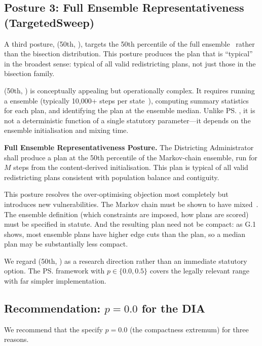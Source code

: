 \subsection{Posture 3: Full Ensemble Representativeness (TargetedSweep)}

A third posture, \ts{}(50th, \recom{}), targets the 50th percentile of the
full \recom{} ensemble~\citep{deford2021} rather than the bisection
distribution.
This posture produces the plan that is ``typical'' in the broadest sense:
typical of all valid redistricting plans, not just those in the bisection
family.

\ts{}(50th, \recom{}) is conceptually appealing but operationally complex.
It requires running a \gc{} \recom{} ensemble (typically 10,000+ steps per
state~\citep{herschlag2020,fifield2020}), computing summary statistics for
each plan, and identifying the plan at the ensemble median.
Unlike \ps{}, it is not a deterministic function of a single statutory
parameter---it depends on the ensemble initialisation and mixing time.

\begin{statute}
\textbf{Full Ensemble Representativeness Posture.}
The Districting Administrator shall produce a plan at the 50th percentile
of the \recom{} Markov-chain ensemble, run for $M$ steps from the
content-derived initialisation.
This plan is typical of all valid redistricting plans consistent with
population balance and contiguity.
\end{statute}

This posture resolves the over-optimising objection most completely but
introduces new vulnerabilities.
The Markov chain must be shown to have mixed~\citep{deford2021}.
The ensemble definition (which constraints are imposed, how plans are scored)
must be specified in statute.
And the resulting plan need not be compact: as G.1 shows, most \recom{}
ensemble plans have higher edge cuts than the \ar{} plan, so a median
\recom{} plan may be substantially less compact.

We regard \ts{}(50th, \recom{}) as a research direction rather than an
immediate statutory option.
The \ps{} framework with $p \in \{0.0, 0.5\}$ covers the legally relevant
range with far simpler implementation.

\subsection{Recommendation: $p = 0.0$ for the DIA}

We recommend that the \dia{} specify $p = 0.0$ (the compactness extremum)
for three reasons.

